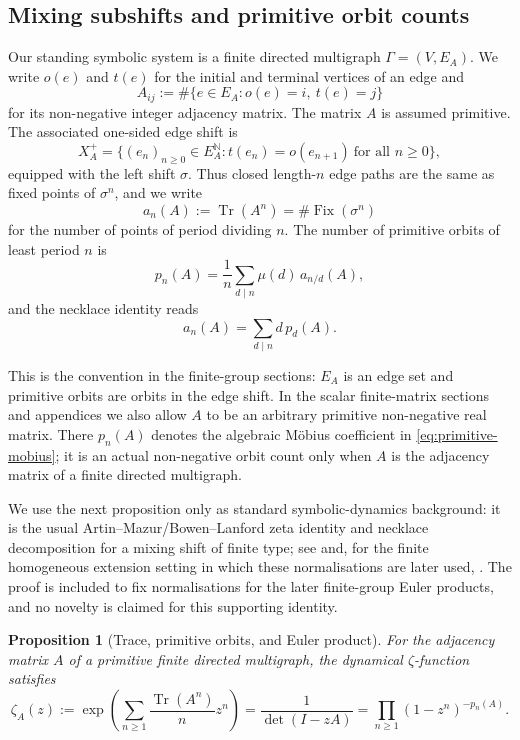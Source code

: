 \documentclass[11pt,a4paper]{amsart}
\theoremstyle{plain}
\newtheorem{proposition}[theorem]{Proposition}
\theoremstyle{definition}
\theoremstyle{remark}
\DeclareMathOperator{\Tr}{Tr}
\newcommand{\NN}{\mathbb{N}}
\begin{document}
\subsection{Mixing subshifts and primitive orbit counts}

Our standing symbolic system is a finite directed multigraph
\(\Gamma=(V,E_A)\).  We write \(o(e)\) and \(t(e)\) for the initial and
terminal vertices of an edge and
\[
  A_{ij}:=\#\{e\in E_A:o(e)=i,\ t(e)=j\}
\]
for its non-negative integer adjacency matrix.  The matrix \(A\) is
assumed primitive.  The associated one-sided edge shift is
\[
  X_A^+
  =
  \bigl\{(e_n)_{n\ge 0}\in E_A^{\NN}:
    t(e_n)=o(e_{n+1})\ \text{for all }n\ge 0\bigr\},
\]
equipped with the left shift \(\sigma\).  Thus closed length-\(n\) edge
paths are the same as fixed points of \(\sigma^n\), and we write
\[
  a_n(A):=\Tr(A^n)=\#\operatorname{Fix}(\sigma^n)
\]
for the number of points of period dividing \(n\). The number of
primitive orbits of least period \(n\) is
\begin{equation}\label{eq:primitive-mobius}
  p_n(A)=\frac{1}{n}\sum_{d\mid n}\mu(d)\,a_{n/d}(A),
\end{equation}
and the necklace identity reads
\begin{equation}\label{eq:trace-primitive-identity}
  a_n(A)=\sum_{d\mid n}d\,p_d(A).
\end{equation}

This is the convention in the finite-group sections: \(E_A\) is an edge
set and primitive orbits are orbits in the edge shift.  In the scalar
finite-matrix sections and appendices we also allow \(A\) to be an
arbitrary primitive non-negative real matrix.  There \(p_n(A)\) denotes
the algebraic M\"obius coefficient in \eqref{eq:primitive-mobius}; it is
an actual non-negative orbit count only when \(A\) is the adjacency
matrix of a finite directed multigraph.

We use the next proposition only as standard symbolic-dynamics
background: it is the usual Artin--Mazur/Bowen--Lanford zeta identity
and necklace decomposition for a mixing shift of finite type; see
\cite{ArtinMazur1965PeriodicPoints,BowenLanford1970Zeta,LindMarcus1995,ParryPollicott1990Zeta}
and, for the finite homogeneous extension setting in which these
normalisations are later used,
\cite{NooraniParry1992ChebotarevShifts}.  The proof is included to fix
normalisations for the later finite-group Euler products, and no novelty is
claimed for this supporting identity.

\begin{proposition}[Trace, primitive orbits, and Euler product]
  \label{prop:prelim-trace-primitive}
  For the adjacency matrix \(A\) of a primitive finite directed
  multigraph, the dynamical \(\zeta\)-function
  satisfies
  \begin{equation}\label{eq:zeta-def}
    \zeta_A(z)
    :=\exp\!\left(\sum_{n\ge 1}\frac{\Tr(A^n)}{n}z^n\right)
    =\frac{1}{\det(I-zA)}
    =\prod_{n\ge 1}(1-z^n)^{-p_n(A)}.
  \end{equation}
\end{proposition}
\end{document}

